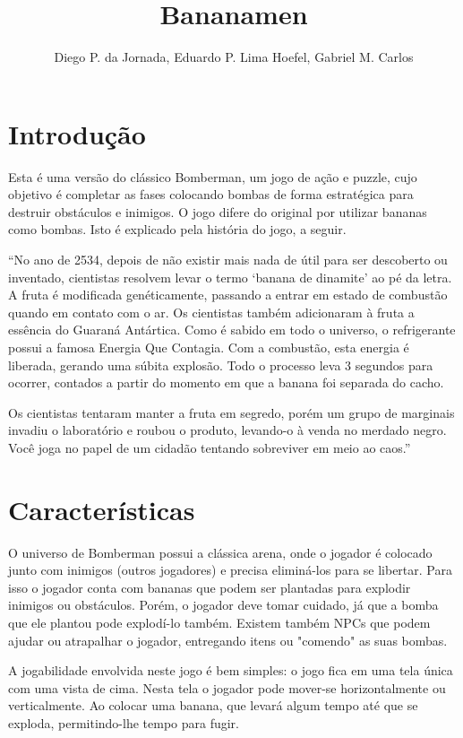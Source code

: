 \documentclass[12pt]{article}
\title{Bananamen}
\author{Diego P. da Jornada, Eduardo P. Lima Hoefel, Gabriel M. Carlos}
\begin{document}
 

\maketitle

\section{Introdução}

	Esta é uma versão do clássico Bomberman, um jogo de ação
	e puzzle, cujo objetivo é completar as fases colocando
	bombas de forma estratégica para destruir obstáculos e
	inimigos. O jogo difere do original por utilizar bananas
	como bombas. Isto é explicado pela história do jogo, a
	seguir.
	
	``No ano de 2534, depois de não existir mais nada de útil
	para ser descoberto ou inventado, cientistas resolvem
	levar o termo `banana de dinamite' ao pé da letra. A
	fruta é modificada genéticamente, passando a entrar em
	estado de combustão quando em contato com o ar. Os
	cientistas também adicionaram à fruta a essência do
	Guaraná Antártica\textregistered.  Como é sabido em todo
	o universo, o refrigerante possui a famosa Energia Que
	Contagia\texttrademark. Com a combustão, esta energia é
	liberada, gerando uma súbita explosão.  Todo o processo
	leva 3 segundos para ocorrer, contados a partir do
	momento em que a banana foi separada do cacho.

	Os cientistas tentaram manter a fruta em segredo, porém
	um grupo de marginais invadiu o laboratório e roubou o
	produto, levando-o à venda no merdado negro. Você joga
	no papel de um cidadão tentando sobreviver em meio ao
	caos.''

\section{Características}

	O universo de Bomberman possui a clássica arena, onde o
	jogador é colocado junto com inimigos (outros jogadores)
	e precisa eliminá-los para se libertar. Para isso o
	jogador conta com bananas que podem ser plantadas 
	para explodir inimigos ou obstáculos. Porém, o jogador 
	deve tomar cuidado, já que a bomba que ele plantou pode
	explodí-lo também. Existem também NPCs que podem ajudar 
	ou atrapalhar o jogador, entregando itens ou "comendo"
	as suas bombas.

	A jogabilidade envolvida neste jogo é bem simples: o
	jogo fica em uma tela única com uma vista de cima. Nesta
	tela o jogador pode mover-se horizontalmente ou
	verticalmente. Ao colocar uma banana, que levará algum
	tempo até que se exploda, permitindo-lhe tempo para
	fugir.
\end{document}

